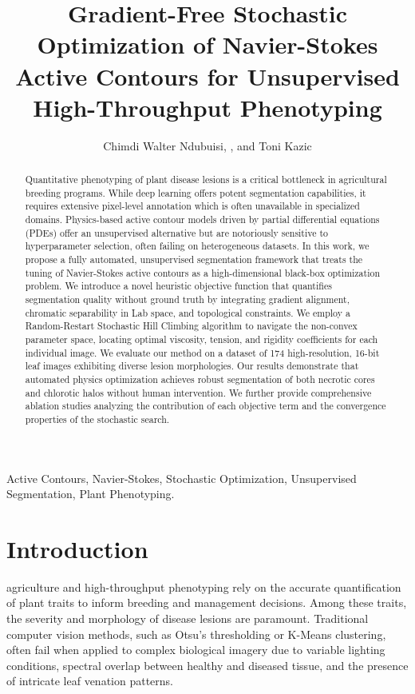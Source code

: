 \documentclass[journal]{IEEEtran}
\begin{document}
\title{Gradient-Free Stochastic Optimization of Navier-Stokes Active Contours for Unsupervised High-Throughput Phenotyping}

\author{Chimdi Walter Ndubuisi, , and Toni Kazic}

\maketitle

\begin{abstract}
Quantitative phenotyping of plant disease lesions is a critical bottleneck in agricultural breeding programs. While deep learning offers potent segmentation capabilities, it requires extensive pixel-level annotation which is often unavailable in specialized domains. Physics-based active contour models driven by partial differential equations (PDEs) offer an unsupervised alternative but are notoriously sensitive to hyperparameter selection, often failing on heterogeneous datasets. In this work, we propose a fully automated, unsupervised segmentation framework that treats the tuning of Navier-Stokes active contours as a high-dimensional black-box optimization problem. We introduce a novel heuristic objective function that quantifies segmentation quality without ground truth by integrating gradient alignment, chromatic separability in Lab space, and topological constraints. We employ a Random-Restart Stochastic Hill Climbing algorithm to navigate the non-convex parameter space, locating optimal viscosity, tension, and rigidity coefficients for each individual image. We evaluate our method on a dataset of 174 high-resolution, 16-bit leaf images exhibiting diverse lesion morphologies. Our results demonstrate that automated physics optimization achieves robust segmentation of both necrotic cores and chlorotic halos without human intervention. We further provide comprehensive ablation studies analyzing the contribution of each objective term and the convergence properties of the stochastic search.
\end{abstract}

\begin{IEEEkeywords}
Active Contours, Navier-Stokes, Stochastic Optimization, Unsupervised Segmentation, Plant Phenotyping.
\end{IEEEkeywords}

\section{Introduction}
 agriculture and high-throughput phenotyping rely on the accurate quantification of plant traits to inform breeding and management decisions. Among these traits, the severity and morphology of disease lesions are paramount. Traditional computer vision methods, such as Otsu's thresholding or K-Means clustering, often fail when applied to complex biological imagery due to variable lighting conditions, spectral overlap between healthy and diseased tissue, and the presence of intricate leaf venation patterns.
\end{document}
